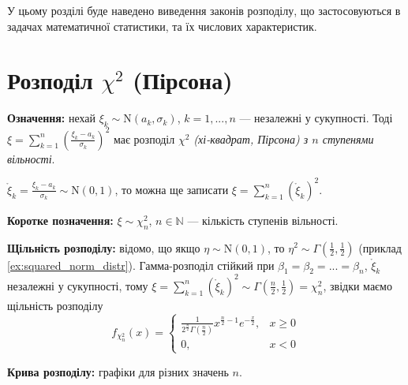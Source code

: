 
У цьому розділі буде наведено виведення законів розподілу, що застосовуються
в задачах математичної статистики, та їх числових характеристик.

\section{Розподіл \texorpdfstring{$\chi^2$}{x2} (Пірсона)}
\noindent\textbf{Означення:}
    нехай $\xi_k \sim \mathrm{N}(a_k, \sigma_k)$, $k= 1,..., n$ --- незалежні у сукупності.
    Тоді $\xi = \sum\limits_{k=1}^n \left( \frac{\xi_k - a_k}{\sigma_k}\right)^2$ має
    розподіл \emph{$\chi^2$ (хі-квадрат, Пірсона) з $n$ ступенями вільності}.

     $\mathring{\xi}_{k} = \frac{\xi_k - a_k}{\sigma_k} \sim \mathrm{N}(0, 1)$, то можна ще записати
    $\xi = \sum\limits_{k=1}^n (\mathring{\xi}_{k})^2$.

\noindent\textbf{Коротке позначення:} $\xi \sim \chi_n^2$, $n\in\mathbb{N}$ --- кількість ступенів вільності.

\noindent\textbf{Щільність розподілу:}
відомо, що якщо $\eta \sim \mathrm{N}(0, 1)$, то $\eta^2 \sim \Gamma\left(\frac{1}{2}, \frac{1}{2}\right)$ (приклад \ref{ex:squared_norm_distr}).
Гамма-розподіл стійкий при $\beta_1 = \beta_2 = ... = \beta_n$, $\mathring{\xi}_{k}$ незалежні у сукупності,
тому $\xi = \sum\limits_{k=1}^n (\mathring{\xi}_{k})^2 \sim \Gamma\left(\frac{n}{2}, \frac{1}{2}\right) = \chi_n^2$,
звідки маємо щільність розподілу
\begin{equation*}
    f_{\chi_n^2}(x) = \begin{cases}
        \frac{1}{2^{\frac{n}{2}} \Gamma\left(\frac{n}{2}\right)} x^{\frac{n}{2}-1} e^{-\frac{x}{2}}, & x \geq 0 \\
        0, & x < 0
    \end{cases}
\end{equation*}

\noindent \textbf{Крива розподілу:} графіки для різних значень $n$.
\begin{center}
\end{center}


